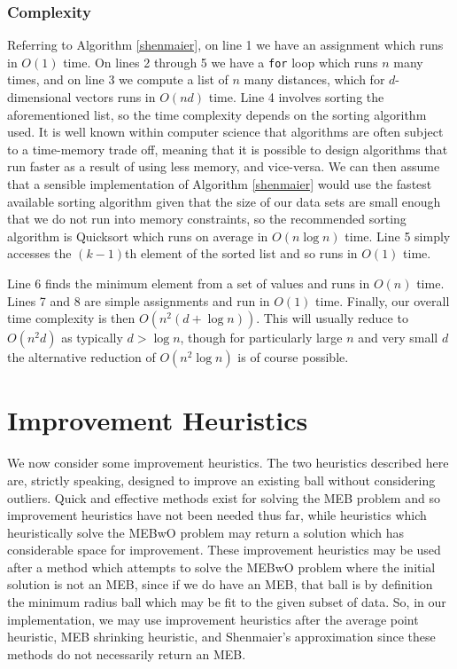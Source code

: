\documentclass[11pt,twoside]{report}
\theoremstyle{definition}
\numberwithin{theorem}{section}
\numberwithin{definition}{section}
\numberwithin{lemma}{section}
\numberwithin{proposition}{section}
\numberwithin{equation}{section}
\numberwithin{figure}{section}
\begin{document}
\subsubsection{Complexity}
Referring to Algorithm \ref{shenmaier}, on line 1 we have an assignment which runs in $O(1)$ time. On lines 2 through 5 we have a \texttt{for} loop which runs $n$ many times, and on line 3 we compute a list of $n$ many distances, which for $d$-dimensional vectors runs in $O(nd)$ time. Line 4 involves sorting the aforementioned list, so the time complexity depends on the sorting algorithm used. It is well known within computer science that algorithms are often subject to a time-memory trade off, meaning that it is possible to design algorithms that run faster as a result of using less memory, and vice-versa. We can then assume that a sensible implementation of Algorithm \ref{shenmaier} would use the fastest available sorting algorithm given that the size of our data sets are small enough that we do not run into memory constraints, so the recommended sorting algorithm is Quicksort \cite{hoare1962quicksort} which runs on average in $O(n\log n)$ time. Line 5 simply accesses the $(k-1)$th element of the sorted list and so runs in $O(1)$ time.

Line 6 finds the minimum element from a set of values and runs in $O(n)$ time. Lines 7 and 8 are simple assignments and run in $O(1)$ time. Finally, our overall time complexity is then $O(n^2(d+\log n))$. This will usually reduce to $O(n^2d)$ as typically $d>\log n$, though for particularly large $n$ and very small $d$ the alternative reduction of $O(n^2\log n)$ is of course possible.


\section{Improvement Heuristics}\label{sec:improvement_heuristics}
We now consider some improvement heuristics. The two heuristics described here are, strictly speaking, designed to improve an existing ball without considering outliers. Quick and effective methods exist for solving the MEB problem and so improvement heuristics have not been needed thus far, while heuristics which heuristically solve the MEBwO problem may return a solution which has considerable space for improvement. These improvement heuristics may be used after a method which attempts to solve the MEBwO problem where the initial solution is not an MEB, since if we do have an MEB, that ball is by definition the minimum radius ball which may be fit to the given subset of data. So, in our implementation, we may use improvement heuristics after the average point heuristic, MEB shrinking heuristic, and Shenmaier's approximation since these methods do not necessarily return an MEB.
\end{document}
